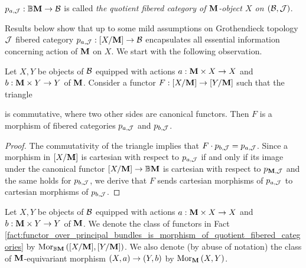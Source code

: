 \begin{definition}
$p_{a,{\mathcal J}}:\mathbb{B}\mathbf{M}\rightarrow {\mathcal B}$ is called \textit{the quotient fibered category of $\mathbf{M}$-object $X$ on $({\mathcal B},{\mathcal J})$}.
\end{definition}
\noindent
Results below show that up to some mild assumptions on Grothendieck topology ${\mathcal J}$ fibered category $p_{a,{\mathcal J}}:[X/\mathbf{M}]\rightarrow {\mathcal B}$ encapsulates all essential information concerning action of $\mathbf{M}$ on $X$. We start with the following observation.

\begin{fact}\label{fact:functor_over_principal_bundles_is_morphism_of_quotient_fibered_categories}
Let $X,Y$ be objects of ${\mathcal B}$ equipped with actions $a:\mathbf{M}\times X\rightarrow X$ and $b:\mathbf{M}\times Y\rightarrow Y$ of $\mathbf{M}$. Consider a functor $F:[X/\mathbf{M}]\rightarrow [Y/\mathbf{M}]$ such that the triangle
\begin{center}
\end{center}
is commutative, where two other sides are canonical functors. Then $F$ is a morphism of fibered categories $p_{a,{\mathcal J}}$ and $p_{b,{\mathcal J}}$.
\end{fact}
\begin{proof}
The commutativity of the triangle implies that $F\cdot p_{b,{\mathcal J}} = p_{a,{\mathcal J}}$. Since a morphism in $[X/\mathbf{M}]$ is cartesian with respect to $p_{a,{\mathcal J}}$ if and only if its image under the canonical functor $[X/\mathbf{M}]\rightarrow \mathbb{B}\mathbf{M}$ is cartesian with respect to $p_{\mathbf{M},{\mathcal J}}$ and the same holds for $p_{b,{\mathcal J}}$, we derive that $F$ sends cartesian morphisms of $p_{a,{\mathcal J}}$ to cartesian morphisms of $p_{b,{\mathcal J}}$. 
\end{proof}
\noindent
Let $X,Y$ be objects of ${\mathcal B}$ equipped with actions $a:\mathbf{M}\times X\rightarrow X$ and $b:\mathbf{M}\times Y\rightarrow Y$ of $\mathbf{M}$. We denote the class of functors in Fact \ref{fact:functor_over_principal_bundles_is_morphism_of_quotient_fibered_categories} by $\mathrm{Mor}_{\mathbb{B}\mathbf{M}}\left([X/\mathbf{M}],[Y/\mathbf{M}]\right)$. We also denote (by abuse of notation) the class of $\mathbf{M}$-equivariant morphism $(X,a)\rightarrow (Y,b)$ by $\mathrm{Mor}_{\mathbf{M}}\left(X,Y\right)$.

